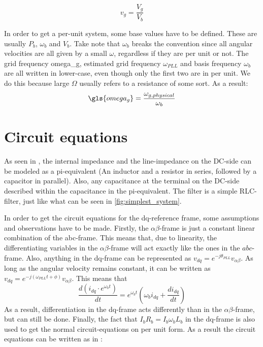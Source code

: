\begin{equation}
 v_g = \frac{V_g}{V_b}
\end{equation}{}

In order to get a per-unit system, some base values have to be defined. These are usually $P_b$, $\omega_b$ and $V_b$. Take note that $\omega_b$ breaks the convention since all angular velocities are all given by a small $\omega$, regardless if they are per unit or not. The grid frequency \gls{omega_g}, estimated grid frequency $\omega_{PLL}$ and basis frequency $\omega_b$ are all written in lower-case, even though only the first two are in per unit. We do this because large $\Omega$ usually refers to a resistance of some sort. As a result: 
\begin{equation}
 \gls{omega_g} = \frac{\omega_{g, physical}}{\omega_{b}} 
\end{equation}
\section{Circuit equations}
As seen in \cite{Suul_paper_1}, the internal impedance and the line-impedance on the DC-side can be modeled as a pi-equivalent (An inductor and a resistor in series, followed by a capacitor in parallel). Also, any capacitance at the terminal on the DC-side described within the capacitance in the pi-equivalent. The filter is a simple RLC-filter, just like what can be seen in \cref{fig:simplest_system}.

In order to get the circuit equations for the dq-reference frame, some assumptions and observations have to be made. 
Firstly, the $\alpha\beta$-frame is just a constant linear combination of the abc-frame. This means that, due to linearity, the differentiating variables in the $\alpha\beta$-frame will act exactly like the ones in the $abc$-frame. 
Also, anything in the dq-frame can be represented as $v_{dq} = e^{-j\theta_{PLL}} v_{\alpha\beta}$. As long as the angular velocity remains constant, it can be written as $v_{dq} = e^{-j\left(\omega_{PLL} t + \phi \right)} v_{\alpha\beta}$. This means that 
\begin{equation}
 \frac{d \left( i_{dq} \cdot e^{\omega_b t}\right) }{dt} = e^{\omega_b t} \left( \omega_b i_{dq} + \frac{d i_{dq}}{dt} \right) 
\end{equation}
As a result, differentiation in the dq-frame acts differently than in the $\alpha\beta$-frame, but can still be done. 
Finally, the fact that $I_b R_b = I_b \omega_b L_b$ in the dq-frame is also used to get the normal circuit-equations on per unit form. As a result the circuit equations can be written as in \cite{Suul_paper_1}: 


